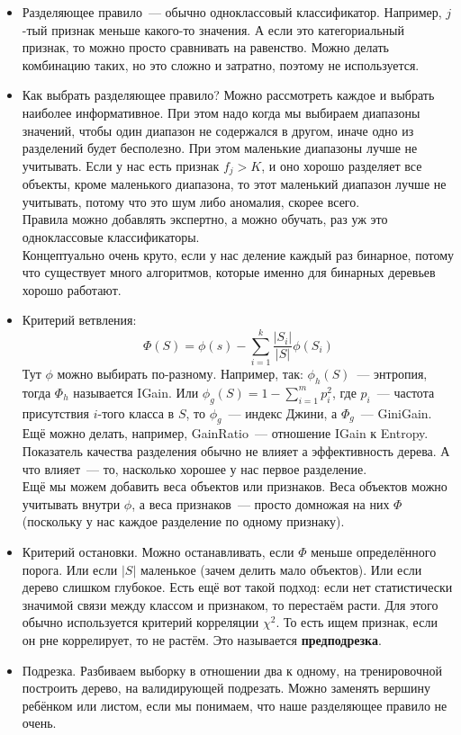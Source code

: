 \documentclass{article}
\begin{document}
    \begin{itemize}
        \item Разделяющее правило~--- обычно одноклассовый классификатор. Например, $j$-тый признак меньше какого-то значения. А если это категориальный признак, то можно просто сравнивать на равенство. Можно делать комбинацию таких, но это сложно и затратно, поэтому не используется.
        \item Как выбрать разделяющее правило? Можно рассмотреть каждое и выбрать наиболее информативное. При этом надо когда мы выбираем диапазоны значений, чтобы один диапазон не содержался в другом, иначе одно из разделений будет бесполезно. При этом маленькие диапазоны лучше не учитывать. Если у нас есть признак $f_j>K$, и оно хорошо разделяет все объекты, кроме маленького диапазона, то этот маленький диапазон лучше не учитывать, потому что это шум либо аномалия, скорее всего.\\
        Правила можно добавлять экспертно, а можно обучать, раз уж это одноклассовые классификаторы.\\
        Концептуально очень круто, если у нас деление каждый раз бинарное, потому что существует много алгоритмов, которые именно для бинарных деревьев хорошо работают.
        \item Критерий ветвления:
        \[
        \Phi(S)=\phi(s)-\sum\limits_{i=1}^k\frac{|S_i|}{|S|}\phi(S_i)
        \]
        Тут $\phi$ можно выбирать по-разному. Например, так: $\phi_h(S)$~--- энтропия, тогда $\Phi_h$ называется IGain. Или $\phi_g(S)=1-\sum_{i=1}^mp_i^2$, где $p_i$~--- частота присутствия $i$-того класса в $S$, то $\phi_g$~--- индекс Джини, а $\Phi_g$~--- GiniGain. Ещё можно делать, например, GainRatio~--- отношение IGain к Entropy.\\
        Показатель качества разделения обычно не влияет а эффективность дерева. А что влияет~--- то, насколько хорошее у нас первое разделение.\\
        Ещё мы можем добавить веса объектов или признаков. Веса объектов можно учитывать внутри $\phi$, а веса признаков~--- просто домножая на них $\Phi$ (поскольку у нас каждое разделение по одному признаку).
        \item Критерий остановки. Можно останавливать, если $\Phi$ меньше определённого порога. Или если $|S|$ маленькое (зачем делить мало объектов). Или если дерево слишком глубокое. Есть ещё вот такой подход: если нет статистически значимой связи между классом и признаком, то перестаём расти. Для этого обычно используется критерий корреляции $\chi^2$. То есть ищем признак, если он рне коррелирует, то не растём. Это называется \textbf{предподрезка}.
        \item Подрезка. Разбиваем выборку в отношении два к одному, на тренировочной построить дерево, на валидирующей подрезать. Можно заменять вершину ребёнком или листом, если мы понимаем, что наше разделяющее правило не очень.
    \end{itemize}
\end{document}
